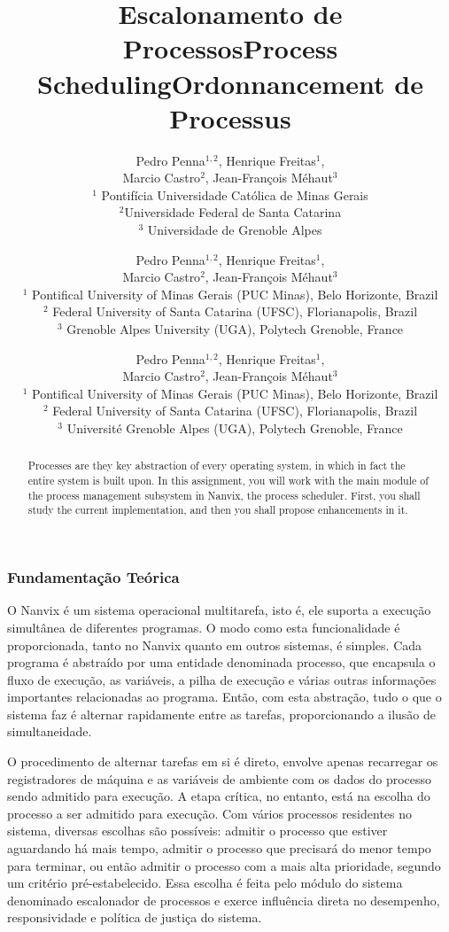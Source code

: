 \documentclass[11pt]{article}
\title{Escalonamento de Processos}
\author{
	Pedro Penna$^{1,2}$, Henrique Freitas$^{1}$,\\
	Marcio Castro$^{2}$, Jean-François Méhaut$^{3}$\\[0.3em]
	\small $^{1}$ Pontifícia Universidade Católica de Minas Gerais\\
	\small $^{2}$Universidade Federal de Santa Catarina\\
	\small $^{3}$ Universidade de Grenoble Alpes
}
\date{}
\title{Process Scheduling}
\author {
	Pedro Penna$^{1,2}$, Henrique Freitas$^{1}$,\\
	Marcio Castro$^{2}$, Jean-François Méhaut$^{3}$\\[0.3em]
	\small $^{1}$ Pontifical University of Minas Gerais (PUC Minas), Belo Horizonte, Brazil\\
	\small $^{2}$ Federal University of Santa Catarina (UFSC), Florianapolis, Brazil\\
	\small $^{3}$ Grenoble Alpes University (UGA), Polytech Grenoble, France}
\date {}
\title{Ordonnancement de Processus}
\author {
	Pedro Penna$^{1,2}$, Henrique Freitas$^{1}$,\\
	Marcio Castro$^{2}$, Jean-François Méhaut$^{3}$\\[0.3em]
	\small $^{1}$ Pontifical University of Minas Gerais (PUC Minas), Belo Horizonte, Brazil\\
	\small $^{2}$ Federal University of Santa Catarina (UFSC), Florianapolis, Brazil\\
	\small $^{3}$ Université Grenoble Alpes (UGA), Polytech Grenoble, France}
\date {}
\newif\ifbr
\newif\ifen
\newif\iffr
\begin{document}
\maketitle

\begin{abstract}

\ifbr
	\noindent Processos consistem na abstração fundamental de um sistema
	operacional: todo o resto do sistema é arquitetado com base nesta
	entidade. Neste projeto, você trabalhará com o principal componente do
	módulo de gerenciamento de processos do Nanvix, o escalonador de
	processos. Primeiramente, você irá estudar como o componente existente
	opera e, em seguida, irá propor melhorias a ele.
\else\ifen
	\noindent Processes are they key abstraction of every operating
	system, in which in fact the entire system is built upon. In this
	assignment, you will work with the main module of the process
	management subsystem in Nanvix, the process scheduler. First, you shall
	study the current implementation, and then you shall propose
	enhancements in it.
\else\iffr
	\noindent Le processus est l'abstraction clé de tout système
	d'exploitation. La conséquence est qu'un système d'exploitation,
	comme Nanvix, repose sur ce concept. Pour cette étape, vous
	travaillerez sur le module principal du sous-système de gestion des
	processus de Nanvix, l'ordonnanceur de processus (\textit{process
	scheduler}). Au départ, vous étudierez et analyserez
	l'implémentation fournie avec Nanvix, et vous proposerez et
	implémenterez ensuite des extensions à cet ordonnanceur.
\fi\fi\fi

\end{abstract}

\ifbr
	\subsubsection*{Fundamentação Teórica}

		O Nanvix é um sistema operacional multitarefa, isto é, ele suporta a
		execução simultânea de diferentes programas. O modo como esta
		funcionalidade é proporcionada, tanto no Nanvix quanto em outros
		sistemas, é simples. Cada programa é abstraído por uma entidade
		denominada processo, que encapsula o fluxo de execução, as
		variáveis, a pilha de execução e várias outras informações
		importantes relacionadas ao programa. Então, com esta abstração,
		tudo o que o sistema faz é alternar rapidamente entre as tarefas,
		proporcionando a ilusão de simultaneidade.

		O procedimento de alternar tarefas em si é direto, envolve apenas
		recarregar os registradores de máquina e as variáveis de ambiente
		com os dados do processo sendo admitido para execução. A etapa
		crítica, no entanto, está na escolha do processo a ser admitido para
		execução. Com vários processos residentes no sistema, diversas
		escolhas são possíveis: admitir o processo que estiver aguardando há
		mais tempo, admitir o processo que precisará do menor tempo para
		terminar, ou então admitir o processo com a mais alta prioridade,
		segundo um critério pré-estabelecido. Essa escolha é feita pelo
		módulo do sistema denominado escalonador de processos e exerce
		influência direta no desempenho, responsividade e política de
		justiça do sistema.
\else\ifen
\end{document}
